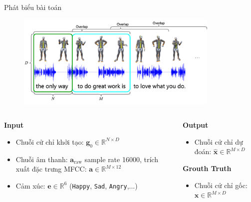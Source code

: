 \documentclass[10pt,mathserif]{beamer}
\begin{document}
\begin{frame}{Phát biểu bài toán}


 \begin{figure}[h]
	\centering
	\includegraphics[height=4.5cm]{GestureSeries}
\end{figure}

\vspace{-10pt}

\begin{columns}
	
	\begin{column}{0.6\textwidth}
		
		\textbf{Input}
		\begin{itemize}
			\item Chuỗi cử chỉ khởi tạo: $\mathbf{g}_{0} \in \mathbb{R}^{N \times D}$
			\item Chuỗi âm thanh: $\mathbf{a}_{\text{raw}}$ sample rate 16000, trích xuất đặc trưng MFCC: $\mathbf{a} \in \mathbb{R}^{M \times 12}$
			\item Cảm xúc: $\mathbf{e} \in \mathbb{R}^6$ (\texttt{Happy},  \texttt{Sad}, \texttt{Angry},...)
		\end{itemize}
		
	\end{column}
	\begin{column}{0.4\textwidth}
		 \textbf{Output}
		 \begin{itemize}
		 	\item Chuỗi cử chỉ dự đoán: $\hat{\mathbf{x}} \in \mathbb{R}^{M \times D}$
		 \end{itemize}
		 
		 \textbf{Grouth Truth}
		 \begin{itemize}
		 	\item Chuỗi cử chỉ gốc: $ \mathbf{x}  \in \mathbb{R}^{M \times D}$
		 \end{itemize}
	\end{column}
\end{columns}

\end{frame}
\end{document}
